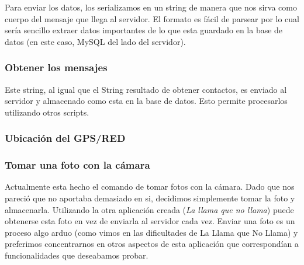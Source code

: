 Para enviar los datos, los serializamos en un string de manera que nos sirva como
cuerpo del mensaje que llega al servidor. El formato es fácil de parsear por lo cual
sería sencillo extraer datos importantes de lo que esta guardado en la base de datos
(en este caso, MySQL del lado del servidor).

\subsubsection{Obtener los mensajes}

Este string, al igual que el String resultado de obtener contactos, es enviado al 
servidor y almacenado como esta en la base de datos. Esto permite procesarlos 
utilizando otros scripts.

\subsubsection{Ubicación del GPS/RED}
%
%
%

\subsubsection{Tomar una foto con la cámara}

Actualmente esta hecho el comando de tomar fotos con la cámara. Dado que nos pareció que
no aportaba demasiado en si, decidimos simplemente tomar la foto y almacenarla. Utilizando
la otra aplicación creada (\textit{La llama que no llama}) puede obtenerse esta foto en vez
de enviarla al servidor cada vez. Enviar una foto es un proceso algo arduo (como vimos en las
dificultades de La Llama que No Llama) y preferimos concentrarnos en otros aspectos de esta 
aplicación que correspondían a funcionalidades que deseabamos probar.

